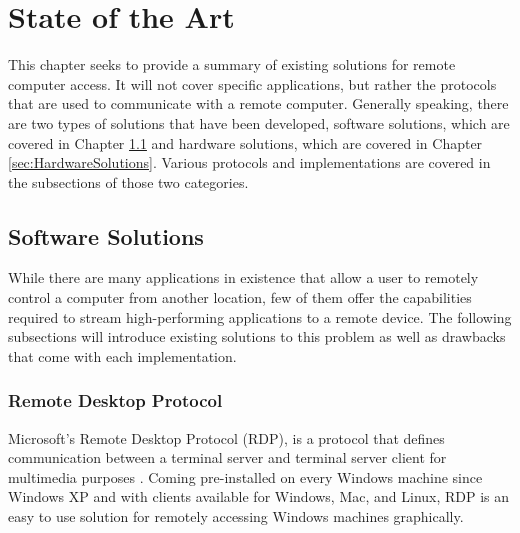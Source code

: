 \chapter{State of the Art}

\label{Chapter3}

This chapter seeks to provide a summary of existing solutions for remote computer access.
It will not cover specific applications, but rather the protocols that are used to communicate with a remote computer.
Generally speaking, there are two types of solutions that have been developed, software solutions, which are covered in Chapter \ref{sec:SoftwareSolutions} and hardware solutions, which are covered in Chapter \ref{sec:HardwareSolutions}.
Various protocols and implementations are covered in the subsections of those two categories.

\section{Software Solutions}\label{sec:SoftwareSolutions}

While there are many applications in existence that allow a user to remotely control a computer from another location, few of them offer the capabilities required to stream high-performing applications to a remote device.
The following subsections will introduce existing solutions to this problem as well as drawbacks that come with each implementation.


\subsection{Remote Desktop Protocol}\label{subsec:RemoteDesktopProtocol}

Microsoft's Remote Desktop Protocol (RDP), is a protocol that defines communication between a terminal server and terminal server client for multimedia purposes \cite{rdpDocs}.
Coming pre-installed on every Windows machine since Windows XP and with clients available for Windows, Mac, and Linux, RDP is an easy to use solution for remotely accessing Windows machines graphically.

